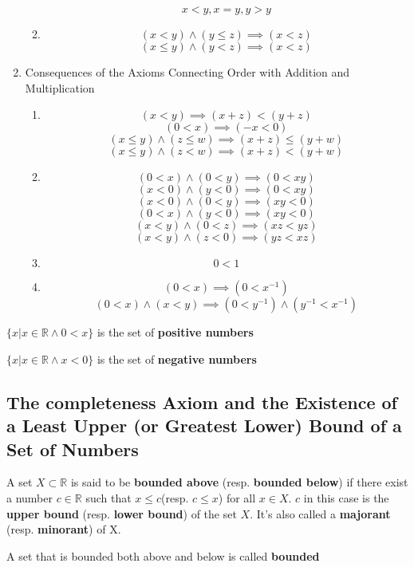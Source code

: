 \documentclass[letter]{article}
\newcommand{\R}{\mathbb{R}}
\newenvironment{definition}[1][Definition]{\begin{trivlist}
\item[\hskip \labelsep {\bfseries #1}]}{\end{trivlist}}
\begin{document}
\begin{enumerate}
\begin{enumerate}
		\[ x<y, x=y, y>y \]
		\item \[(x<y)\wedge(y\leq z) \implies (x<z)\]
			\[(x\leq y)\wedge(y<z) \implies (x<z)\]
	\end{enumerate}
\item Consequences of the Axioms Connecting Order with Addition and Multiplication
	\begin{enumerate}
		\item 
		\[(x<y)\implies (x+z) < (y+z)\]
		\[(0<x)\implies (-x<0)\]
		\[(x\leq y) \wedge (z\leq w) \implies (x+z) \leq (y+w)\]
		\[(x\leq y) \wedge (z< w) \implies (x+z) < (y+w)\]
		\item
		\[(0<x) \wedge (0<y) \implies (0<xy)\]
		\[(x<0) \wedge (y<0) \implies (0<xy)\]
		\[(x<0) \wedge (0<y) \implies (xy<0)\]
		\[(0<x) \wedge (y<0) \implies (xy<0)\]
		\[(x<y) \wedge (0<z) \implies (xz<yz)\]
		\[(x<y) \wedge (z<0) \implies (yz<xz)\]
		\item \[0<1\]
		\item 
		\[(0<x)\implies (0<x^{-1})\]
		\[(0<x)\wedge(x<y) \implies (0<y^{-1}) \wedge (y^{-1} < x^{-1})\]
	\end{enumerate}
\end{enumerate}
\begin{definition}
$\{x| x\in \R \wedge 0<x\}$ is the set of \textbf{positive numbers}
\end{definition}
\begin{definition}
$\{x| x\in \R \wedge x<0\}$ is the set of \textbf{negative numbers}
\end{definition}

\subsection{The completeness Axiom and the Existence of a Least Upper (or Greatest Lower) Bound of a Set of Numbers}
\begin{definition}
A set $X\subset \R$ is said to be \textbf{bounded above} (resp. \textbf{bounded below}) if there exist a number $c \in \R$ such that $x\leq c$(resp. $c\leq x$) for all $x\in X$. $c$ in this case is the \textbf{upper bound} (resp. \textbf{lower bound}) of the set $X$. It's also called a \textbf{majorant} (resp. \textbf{minorant}) of X.
\end{definition}

\begin{definition}
A set that is bounded both above and below is called \textbf{bounded}
\end{definition}
\end{document}
